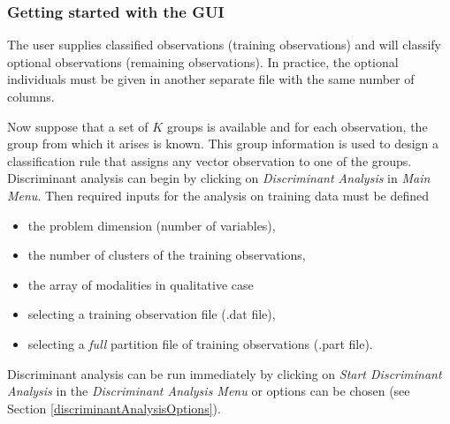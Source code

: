 \subsubsection{Getting started with the GUI}

The user supplies classified observations (training observations) and will
classify optional observations (remaining observations). In practice, the
optional individuals must be given in another
separate file with the same number of columns.

Now suppose that a set of $K$ groups is available and for each
observation, the group from which it arises is known. This group
information is used to design a classification rule that assigns any vector
observation to one of the groups.\\

Discriminant analysis can begin by clicking on {\em Discriminant Analysis} in {\em Main Menu}. Then required
inputs for the analysis on training data must be defined
\begin{itemize}
  \item the problem dimension (number of variables),
  \item the number of clusters of the training observations,
  \item the array of modalities in qualitative case

  \item selecting a training observation file (.dat file),

  \item selecting a {\em full} partition file of training observations (.part file).
\end{itemize}

Discriminant analysis can be run immediately by
clicking on {\em Start Discriminant Analysis} in the {\em Discriminant Analysis Menu} or options can be chosen (see Section \ref{discriminantAnalysisOptions}).

